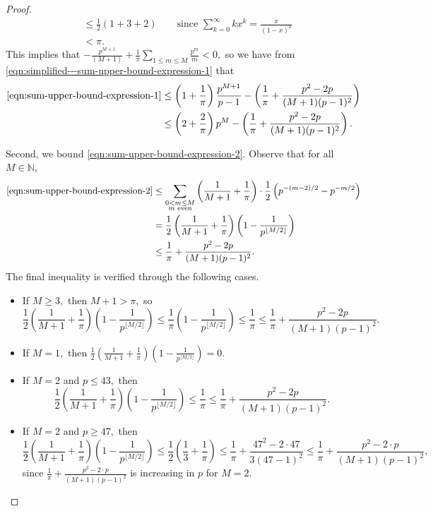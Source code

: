 \documentclass[10pt,a4paper]{amsart}
\begin{document}
\begin{proof}
\begin{align*}
    &\leq \frac{1}{2} \left( 1 + 3 + 2 \right) \qquad  \text{since $\sum_{k = 0}^\infty k x^k = \frac{x}{(1 - x)^2}$}\\
    &< \pi.
\end{align*}
This implies that $- \frac{p^{M + 1}}{(M + 1)}  + \frac{1}{\pi}  \sum_{1 \leq m \leq M} \frac{p^m}{m} < 0,$ so we have from \eqref{eqn:simplified---sum-upper-bound-expression-1} that
\begin{align}
     \eqref{eqn:sum-upper-bound-expression-1} &\leq \left( 1 + \frac{1}{\pi} \right)\frac{ p^{M + 1} }{p - 1} - \left( \frac{1}{\pi} + \frac{p^2 - 2p}{(M + 1)(p - 1)^2} \right) \\
    &\leq \left(2 + \frac{2}{\pi} \right) p^M - \left( \frac{1}{\pi} + \frac{p^2 - 2p}{(M + 1)(p - 1)^2} \right) \label{eqn:simplified-expression-2}.
\end{align}

Second, we bound \eqref{eqn:sum-upper-bound-expression-2}. Observe that for all $M \in \mathbb{N},$
\begin{align}
    \eqref{eqn:sum-upper-bound-expression-2} &\leq \sum_{\substack{0 < m \leq M\\ \text{$m$ even}}} \left( \frac{1}{M + 1} + \frac{1}{\pi} \right) \cdot \frac{1}{2}\left( p^{-(m - 2)/2} - p^{-m/2}\right)\\
    &= \frac{1}{2}\left( \frac{1}{M + 1} + \frac{1}{\pi} \right) \left( 1 - \frac{1}{p^{\lfloor M/2 \rfloor}} \right)\\
    &\leq  \frac{1}{\pi} + \frac{p^2 - 2p}{(M + 1)(p - 1)^2}.
\end{align}
The final inequality is verified through the following cases.
\begin{itemize}
    \item If $M \geq 3,$ then $M + 1 > \pi,$ so
    $$\frac{1}{2}\left( \frac{1}{M + 1} + \frac{1}{\pi} \right) \left( 1 - \frac{1}{p^{\lfloor M/2 \rfloor}} \right) \leq \frac{1}{\pi} \left( 1 - \frac{1}{p^{\lfloor M/2 \rfloor}} \right) \leq \frac{1}{\pi} \leq \frac{1}{\pi} + \frac{p^2 - 2p}{(M + 1)(p - 1)^2}.$$
    \item If $M = 1,$ then $\frac{1}{2}\left( \frac{1}{M + 1} + \frac{1}{\pi} \right) \left( 1 - \frac{1}{p^{\lfloor M/2 \rfloor}} \right) = 0.$
    \item If $M = 2$ and $p \leq 43,$ then
    $$\frac{1}{2}\left( \frac{1}{M + 1} + \frac{1}{\pi} \right) \left( 1 - \frac{1}{p^{\lfloor M/2 \rfloor}} \right) \leq \frac{1}{\pi} \leq \frac{1}{\pi} + \frac{p^2 - 2p}{(M + 1)(p - 1)^2}.$$
    \item If $M = 2$ and $p \geq 47,$ then
    $$\frac{1}{2}\left( \frac{1}{M + 1} + \frac{1}{\pi} \right) \left( 1 - \frac{1}{p^{\lfloor M/2 \rfloor}} \right) \leq \frac{1}{2} \left( \frac{1}{3} + \frac{1}{\pi} \right) \leq \frac{1}{\pi} + \frac{47^2 - 2 \cdot 47}{3 (47 - 1)^2} \leq \frac{1}{\pi} + \frac{p^2 - 2 \cdot p}{(M + 1) (p - 1)^2},$$
    since $\frac{1}{\pi} + \frac{p^2 - 2 \cdot p}{(M + 1) (p - 1)^2}$ is increasing in $p$ for $M = 2.$
\end{itemize}


\end{proof}
\end{document}
